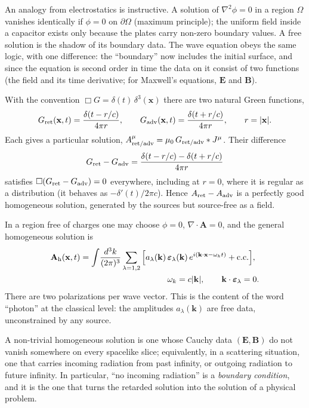 An analogy from electrostatics is instructive. A solution of
$\nabla^2\phi=0$ in a region $\Omega$ vanishes identically if $\phi=0$ on
$\partial\Omega$ (maximum principle); the uniform field inside a capacitor
exists only because the plates carry non-zero boundary values. A free
solution is the shadow of its boundary data. The wave equation obeys the
same logic, with one difference: the ``boundary'' now includes the initial
surface, and since the equation is second order in time the data on it
consist of two functions (the field and its time derivative; for Maxwell's
equations, $\bm E$ and $\bm B$).

With the convention $\Box G=\delta(t)\,\delta^3(\mathbf x)$ there are two
natural Green functions,
\begin{equation}
G_{\rm ret}(\mathbf x,t)=\frac{\delta(t-r/c)}{4\pi r},\qquad
G_{\rm adv}(\mathbf x,t)=\frac{\delta(t+r/c)}{4\pi r},
\qquad r=|\mathbf x| .
\label{ed-green}
\end{equation}
Each gives a particular solution, $A^\mu_{\rm ret/adv}=\mu_0\,G_{\rm ret/adv}*J^\mu$.
Their difference
\begin{equation}
G_{\rm ret}-G_{\rm adv}=\frac{\delta(t-r/c)-\delta(t+r/c)}{4\pi r}
\label{ed-pauli-jordan}
\end{equation}
satisfies $\Box(G_{\rm ret}-G_{\rm adv})=0$ everywhere, including at $r=0$,
where it is regular as a distribution (it behaves as $-\delta'(t)/2\pi c$).
Hence $A_{\rm ret}-A_{\rm adv}$ is a perfectly good homogeneous solution,
generated by the sources but source-free as a field. 

In a region free of charges one may choose $\phi=0$, $\nabla\cdot\mathbf A=0$,
and the general homogeneous solution is
\begin{equation}
\begin{split}
\mathbf A_{\rm h}(\mathbf x,t)=\int\!\frac{d^3k}{(2\pi)^3}\sum_{\lambda=1,2}
\Big[a_\lambda(\mathbf k)\,&\boldsymbol\varepsilon_\lambda(\mathbf k)\,
e^{i(\mathbf k\cdot\mathbf x-\omega_k t)}+\text{c.c.}\Big],\\
&\omega_k=c|\mathbf k|,\qquad
\mathbf k\cdot\boldsymbol\varepsilon_\lambda=0 .
\end{split}
\label{ed-modes}
\end{equation}
There are two polarizations per wave vector. This is the content of the
word ``photon'' at the classical level: the amplitudes $a_\lambda(\mathbf k)$
are free data, unconstrained by any source.

A non-trivial
homogeneous solution is one whose Cauchy data $(\mathbf E,\mathbf B)$ do
not vanish somewhere on every spacelike slice; equivalently, in a
scattering situation, one that carries incoming radiation from past
infinity, or outgoing radiation to future infinity. In particular, ``no
incoming radiation'' is a \emph{boundary condition}, and it is the one
that turns the retarded solution into the solution of a physical problem.


